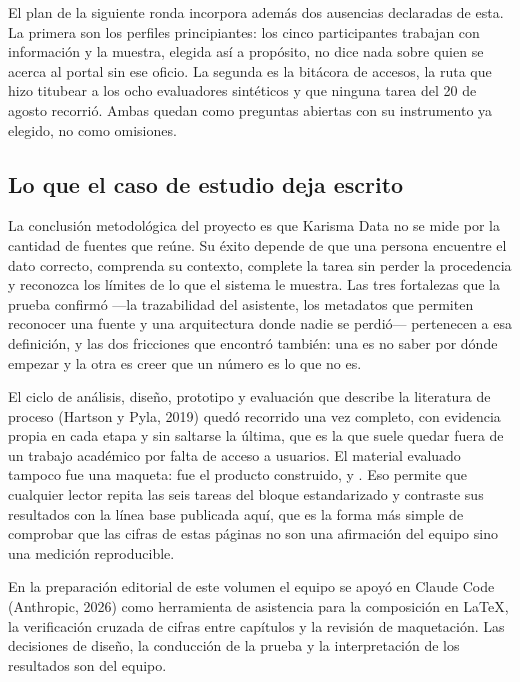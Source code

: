 El plan de la siguiente ronda incorpora además dos ausencias declaradas de esta. La primera son
los perfiles principiantes: los cinco participantes trabajan con información y la muestra, elegida
así a propósito, no dice nada sobre quien se acerca al portal sin ese oficio. La segunda es la
bitácora de accesos, la ruta que hizo titubear a los ocho evaluadores sintéticos y que ninguna
tarea del 20 de agosto recorrió. Ambas quedan como preguntas abiertas con su instrumento ya
elegido, no como omisiones.

\subsection{Lo que el caso de estudio deja escrito}

La conclusión metodológica del proyecto es que Karisma Data no se mide por la cantidad de fuentes
que reúne. Su éxito depende de que una persona encuentre el dato correcto, comprenda su contexto,
complete la tarea sin perder la procedencia y reconozca los límites de lo que el sistema le
muestra. Las tres fortalezas que la prueba confirmó ---la trazabilidad del asistente, los
metadatos que permiten reconocer una fuente y una arquitectura donde nadie se perdió---
pertenecen a esa definición, y las dos fricciones que encontró también: una es no saber por dónde
empezar y la otra es creer que un número es lo que no es.

El ciclo de análisis, diseño, prototipo y evaluación que describe la literatura de proceso
(Hartson y Pyla, 2019) quedó recorrido una vez completo, con evidencia propia en cada etapa y sin
saltarse la última, que es la que suele quedar fuera de un trabajo académico por falta de acceso a
usuarios. El material evaluado tampoco fue una maqueta: fue el producto construido, y
. Eso permite
que cualquier lector repita las seis tareas del bloque estandarizado y contraste sus resultados
con la línea base publicada aquí, que es la forma más simple de comprobar que las cifras de estas
páginas no son una afirmación del equipo sino una medición reproducible.

En la preparación editorial de este volumen el equipo se apoyó en Claude Code (Anthropic, 2026)
como herramienta de asistencia para la composición en LaTeX, la verificación cruzada de cifras
entre capítulos y la revisión de maquetación. Las decisiones de diseño, la conducción de la prueba
y la interpretación de los resultados son del equipo.

